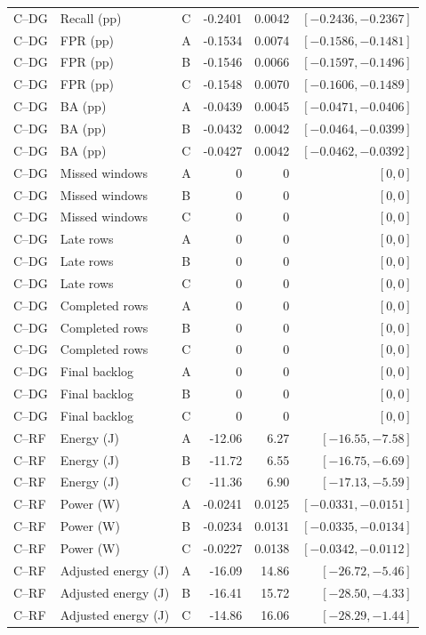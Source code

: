 \begin{longtable}{lllrrr}
C--DG & Recall (pp) & C & -0.2401 & 0.0042 & $[-0.2436,-0.2367]$\\
C--DG & FPR (pp) & A & -0.1534 & 0.0074 & $[-0.1586,-0.1481]$\\
C--DG & FPR (pp) & B & -0.1546 & 0.0066 & $[-0.1597,-0.1496]$\\
C--DG & FPR (pp) & C & -0.1548 & 0.0070 & $[-0.1606,-0.1489]$\\
C--DG & BA (pp) & A & -0.0439 & 0.0045 & $[-0.0471,-0.0406]$\\
C--DG & BA (pp) & B & -0.0432 & 0.0042 & $[-0.0464,-0.0399]$\\
C--DG & BA (pp) & C & -0.0427 & 0.0042 & $[-0.0462,-0.0392]$\\
C--DG & Missed windows & A & 0 & 0 & $[0,0]$\\
C--DG & Missed windows & B & 0 & 0 & $[0,0]$\\
C--DG & Missed windows & C & 0 & 0 & $[0,0]$\\
C--DG & Late rows & A & 0 & 0 & $[0,0]$\\
C--DG & Late rows & B & 0 & 0 & $[0,0]$\\
C--DG & Late rows & C & 0 & 0 & $[0,0]$\\
C--DG & Completed rows & A & 0 & 0 & $[0,0]$\\
C--DG & Completed rows & B & 0 & 0 & $[0,0]$\\
C--DG & Completed rows & C & 0 & 0 & $[0,0]$\\
C--DG & Final backlog & A & 0 & 0 & $[0,0]$\\
C--DG & Final backlog & B & 0 & 0 & $[0,0]$\\
C--DG & Final backlog & C & 0 & 0 & $[0,0]$\\
C--RF & Energy (J) & A & -12.06 & 6.27 & $[-16.55,-7.58]$\\
C--RF & Energy (J) & B & -11.72 & 6.55 & $[-16.75,-6.69]$\\
C--RF & Energy (J) & C & -11.36 & 6.90 & $[-17.13,-5.59]$\\
C--RF & Power (W) & A & -0.0241 & 0.0125 & $[-0.0331,-0.0151]$\\
C--RF & Power (W) & B & -0.0234 & 0.0131 & $[-0.0335,-0.0134]$\\
C--RF & Power (W) & C & -0.0227 & 0.0138 & $[-0.0342,-0.0112]$\\
C--RF & Adjusted energy (J) & A & -16.09 & 14.86 & $[-26.72,-5.46]$\\
C--RF & Adjusted energy (J) & B & -16.41 & 15.72 & $[-28.50,-4.33]$\\
C--RF & Adjusted energy (J) & C & -14.86 & 16.06 & $[-28.29,-1.44]$\\

\end{longtable}
